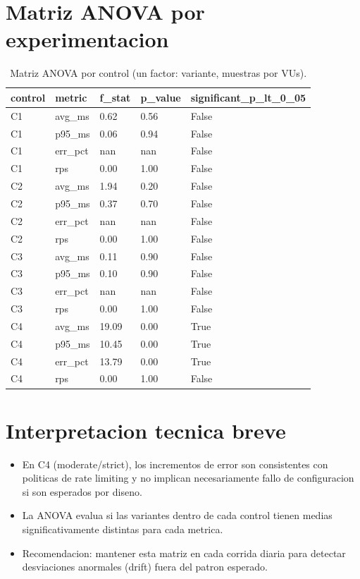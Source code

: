 \documentclass[11pt]{article}
\begin{document}
\section*{Matriz ANOVA por experimentacion}
\begin{table}[h]
\centering
\small
\begin{tabular}{lllll}
\hline
control & metric & f\_stat & p\_value & significant\_p\_lt\_0\_05 \\
\hline
C1 & avg\_ms & 0.62 & 0.56 & False \\
C1 & p95\_ms & 0.06 & 0.94 & False \\
C1 & err\_pct & nan & nan & False \\
C1 & rps & 0.00 & 1.00 & False \\
C2 & avg\_ms & 1.94 & 0.20 & False \\
C2 & p95\_ms & 0.37 & 0.70 & False \\
C2 & err\_pct & nan & nan & False \\
C2 & rps & 0.00 & 1.00 & False \\
C3 & avg\_ms & 0.11 & 0.90 & False \\
C3 & p95\_ms & 0.10 & 0.90 & False \\
C3 & err\_pct & nan & nan & False \\
C3 & rps & 0.00 & 1.00 & False \\
C4 & avg\_ms & 19.09 & 0.00 & True \\
C4 & p95\_ms & 10.45 & 0.00 & True \\
C4 & err\_pct & 13.79 & 0.00 & True \\
C4 & rps & 0.00 & 1.00 & False \\
\hline
\end{tabular}
\caption{Matriz ANOVA por control (un factor: variante, muestras por VUs).}
\label{tab:anova_matrix}
\end{table}

\section*{Interpretacion tecnica breve}
\begin{itemize}
  \item En C4 (moderate/strict), los incrementos de error son consistentes con politicas de rate limiting y no implican necesariamente fallo de configuracion si son esperados por diseno.
  \item La ANOVA evalua si las variantes dentro de cada control tienen medias significativamente distintas para cada metrica.
  \item Recomendacion: mantener esta matriz en cada corrida diaria para detectar desviaciones anormales (drift) fuera del patron esperado.
\end{itemize}
\end{document}
